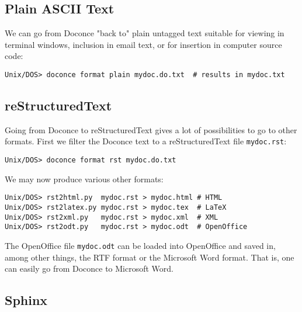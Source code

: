 \documentclass{article}
\begin{document}
\subsection{Plain ASCII Text}

We can go from Doconce "back to" plain untagged text suitable for viewing
in terminal windows, inclusion in email text, or for insertion in
computer source code:
\vspace{4pt}
\begin{Verbatim}[numbers=none,frame=lines,label=\fbox{{\tiny Terminal}},fontsize=\fontsize{9pt}{9pt},
labelposition=topline,framesep=2.5mm,framerule=0.7pt]
Unix/DOS> doconce format plain mydoc.do.txt  # results in mydoc.txt
\end{Verbatim}

\subsection{reStructuredText}

Going from Doconce to reStructuredText gives a lot of possibilities to
go to other formats. First we filter the Doconce text to a
reStructuredText file {\fontsize{10pt}{10pt}\verb!mydoc.rst!}:
\vspace{4pt}
\begin{Verbatim}[numbers=none,frame=lines,label=\fbox{{\tiny Terminal}},fontsize=\fontsize{9pt}{9pt},
labelposition=topline,framesep=2.5mm,framerule=0.7pt]
Unix/DOS> doconce format rst mydoc.do.txt
\end{Verbatim}
We may now produce various other formats:
\vspace{4pt}
\begin{Verbatim}[numbers=none,frame=lines,label=\fbox{{\tiny Terminal}},fontsize=\fontsize{9pt}{9pt},
labelposition=topline,framesep=2.5mm,framerule=0.7pt]
Unix/DOS> rst2html.py  mydoc.rst > mydoc.html # HTML
Unix/DOS> rst2latex.py mydoc.rst > mydoc.tex  # LaTeX
Unix/DOS> rst2xml.py   mydoc.rst > mydoc.xml  # XML
Unix/DOS> rst2odt.py   mydoc.rst > mydoc.odt  # OpenOffice
\end{Verbatim}
The OpenOffice file {\fontsize{10pt}{10pt}\verb!mydoc.odt!} can be loaded into OpenOffice and
saved in, among other things, the RTF format or the Microsoft Word format.
That is, one can easily go from Doconce to Microsoft Word.

\subsection{Sphinx}
\end{document}

